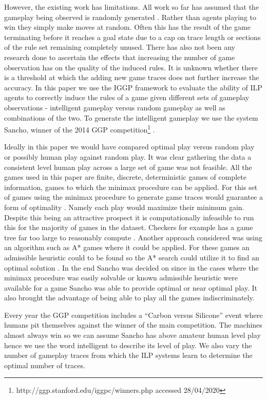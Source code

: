 However, the existing work has limitations. All work so far has assumed that the gameplay being observed is randomly generated \cite{Cropper/IGGP}. Rather than agents playing to win they simply make moves at random. Often this has the result of the game terminating before it reaches a goal state due to a cap on trace length or sections of the rule set remaining completely unused. There has also not been any research done to ascertain the effects that increasing the number of game observation has on the quality of the induced rules. It is unknown whether there is a threshold at which the adding new game traces does not further increase the accuracy. In this paper we use the IGGP framework to evaluate the ability of ILP agents to correctly induce the rules of a game given different sets of gameplay observations - intelligent gameplay versus random gameplay as well as combinations of the two. To generate the intelligent gameplay we use the system Sancho, winner of the 2014 GGP competition\footnote{http://ggp.stanford.edu/iggpc/winners.php accessed 28/04/2020} \cite{Sancho/Github}. 

Ideally in this paper we would have compared optimal play versus random play or possibly human play against random play. It was clear gathering the data a consistent level human play across a large set of game was not feasible. All the games used in this paper are finite, discrete, deterministic games of complete information, games to which the minimax procedure can be applied. For this set of games using the minimax procedure to generate game traces would guarantee a form of optimality \cite{IntroToAlgorithms}. Namely each play would maximize their minimum gain. Despite this being an attractive prospect it is computationally infeasible to run this for the majority of games in the dataset. Checkers for example has a game tree far too large to reasonably compute \cite{Schaeffer/Checkers}. Another approach considered was using an algorithm such as A* games where it could be applied. For these games an admissible heuristic could to be found so the A* search could utilize it to find an optimal solution \cite{IntroToAlgorithms}. In the end Sancho was decided on since in the cases where the minimax procedure was easily solvable or known admissible heuristic were available for a game Sancho was able to provide optimal or near optimal play. It also brought the advantage of being able to play all the games indiscriminately.

Every year the GGP competition includes a ``Carbon versus Silicone'' event where humans pit themselves against the winner of the main competition. The machines almost always win \cite{Genesereth/GGPOverview} so we can assume Sancho has above amateur human level play hence we use the word intelligent to describe its level of play. We also vary the number of gameplay traces from which the ILP systems learn to determine the optimal number of traces.


